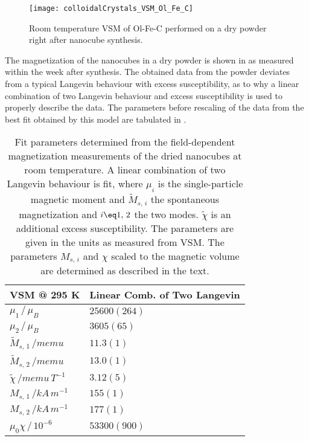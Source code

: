 \documentclass[\main/dresen_thesis.tex]{subfiles}
\begin{document}
  \label{sec:colloidalCrystals:nanoparticle:vsm}
  \begin{figure}[tb]
    \centering
    \texttt{[image: colloidalCrystals\_VSM\_Ol\_Fe\_C]}
    \caption{\label{fig:colloidalCrystals:nanoparticle:vsm}Room temperature VSM of Ol-Fe-C performed on a dry powder right after nanocube synthesis.}
  \end{figure}
  The magnetization of the nanocubes in a dry powder is shown in  as measured within the week after synthesis.
  The obtained data from the powder deviates from a typical Langevin behaviour with excess susceptibility, as to why a linear combination of two Langevin behaviour and excess susceptibility is used to properly describe the data.
  The parameters before rescaling of the data from the best fit obtained by this model are tabulated in .

  \begin{table}[!htbp]
    \centering
    \caption{\label{tab:colloidalCrystals:nanoparticle:vsm} Fit parameters determined from the field-dependent magnetization measurements of the dried nanocubes at room temperature. A linear combination of two Langevin behaviour is fit, where $\mu_i$ is the single-particle magnetic moment and $\tilde{M}_{s,\,i}$ the spontaneous magnetization and $i\eq 1,\,2$ the two modes. $\tilde{\chi}$ is an additional excess susceptibility. The parameters are given in the units as measured from VSM. The parameters $M_{s,\,i}$ and $\chi$ scaled to the magnetic volume are determined as described in the text.}
    \begin{tabular}{ l | l }
      \rule{0pt}{2ex} \textbf{VSM @ 295 K} & Linear Comb. of Two Langevin \\
      \hline
      \rule{0pt}{2ex} $\mu_1 \, / \, \mu_B$                     & $25600(264)$\\
      \rule{0pt}{2ex} $\mu_2 \, / \, \mu_B$                     & $3605(65) $ \\
      \rule{0pt}{2ex} $\tilde{M}_{s,\,1} \, /  \unit{memu}$     & $11.3(1)$    \\
      \rule{0pt}{2ex} $\tilde{M}_{s,\,2} \, /  \unit{memu}$     & $13.0(1)$    \\
      \rule{0pt}{2ex} $\tilde{\chi} \, / \unit{memu \, T^{-1}}$ & $3.12(5)$\\
      \hline
      \rule{0pt}{2ex} $M_{s,\,1} \, /  \unit{kA\,m^{-1}}$       & $155(1)$    \\
      \rule{0pt}{2ex} $M_{s,\,2} \, /  \unit{kA\,m^{-1}}$       & $177(1)$    \\
      \rule{0pt}{2ex} $\mu_0 \chi \, / \, 10^{-6}$              & $53300(900)$\\
      \hline
    \end{tabular}
  \end{table}
\end{document}
